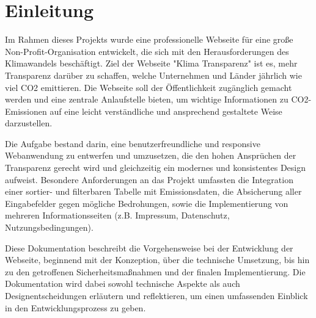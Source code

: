 \section{Einleitung}
Im Rahmen dieses Projekts wurde eine professionelle Webseite für eine große Non-Profit-Organisation entwickelt, die sich mit den Herausforderungen des Klimawandels beschäftigt. Ziel der Webseite "Klima Transparenz" ist es, mehr Transparenz darüber zu schaffen, welche Unternehmen und Länder jährlich wie viel CO2 emittieren. Die Webseite soll der Öffentlichkeit zugänglich gemacht werden und eine zentrale Anlaufstelle bieten, um wichtige Informationen zu CO2-Emissionen auf eine leicht verständliche und ansprechend gestaltete Weise darzustellen.

Die Aufgabe bestand darin, eine benutzerfreundliche und responsive Webanwendung zu entwerfen und umzusetzen, die den hohen Ansprüchen der Transparenz gerecht wird und gleichzeitig ein modernes und konsistentes Design aufweist. Besondere Anforderungen an das Projekt umfassten die Integration einer sortier- und filterbaren Tabelle mit Emissionsdaten, die Absicherung aller Eingabefelder gegen mögliche Bedrohungen, sowie die Implementierung von mehreren Informationsseiten (z.B. Impressum, Datenschutz, Nutzungsbedingungen).

Diese Dokumentation beschreibt die Vorgehensweise bei der Entwicklung der Webseite, beginnend mit der Konzeption, über die technische Umsetzung, bis hin zu den getroffenen Sicherheitsmaßnahmen und der finalen Implementierung. Die Dokumentation wird dabei sowohl technische Aspekte als auch Designentscheidungen erläutern und reflektieren, um einen umfassenden Einblick in den Entwicklungsprozess zu geben.
\lipsum[1-2]
